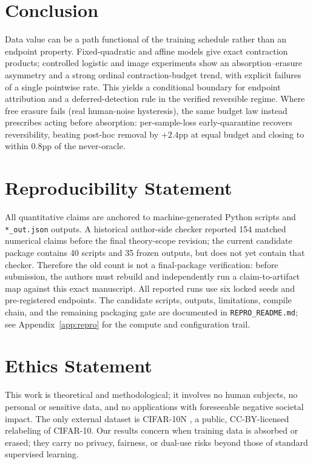 \documentclass{article}
\begin{document}
\section{Conclusion}
Data value can be a path functional of the training schedule rather than an endpoint property.
Fixed-quadratic and affine models give exact contraction products; controlled logistic and image
experiments show an absorption--erasure asymmetry and a strong ordinal contraction-budget trend,
with explicit failures of a single pointwise rate. This yields a conditional boundary for
endpoint attribution and a deferred-detection rule in the verified reversible regime. Where free erasure fails
(real human-noise hysteresis), the same budget law instead prescribes acting before absorption:
per-sample-loss early-quarantine recovers
reversibility, beating post-hoc removal by $+2.4$pp at equal budget and closing to within $0.8$pp
of the never-oracle.

\section*{Reproducibility Statement}
\label{sec:reprostmt}
All quantitative claims are anchored to machine-generated Python scripts and
\texttt{*\_out.json} outputs. A historical author-side checker reported 154
matched numerical claims before the final theory-scope revision; the current
candidate package contains 40 scripts and 35 frozen outputs, but does not yet
contain that checker. Therefore the old count is not a final-package
verification: before submission, the authors must rebuild and independently
run a claim-to-artifact map against this exact manuscript. All reported runs
use six locked seeds and pre-registered endpoints. The candidate scripts,
outputs, limitations, compile chain, and the remaining packaging gate are
documented in \texttt{REPRO\_README.md}; see Appendix~\ref{app:repro} for the
compute and configuration trail.

\section*{Ethics Statement}
\label{sec:ethics}
This work is theoretical and methodological; it involves no human subjects, no
personal or sensitive data, and no applications with foreseeable negative
societal impact. The only external dataset is CIFAR-10N \citep{wei2022cifar10n},
a public, CC-BY-licensed relabeling of CIFAR-10. Our results concern when
training data is absorbed or erased; they carry no privacy, fairness, or
dual-use risks beyond those of standard supervised learning.
\end{document}
